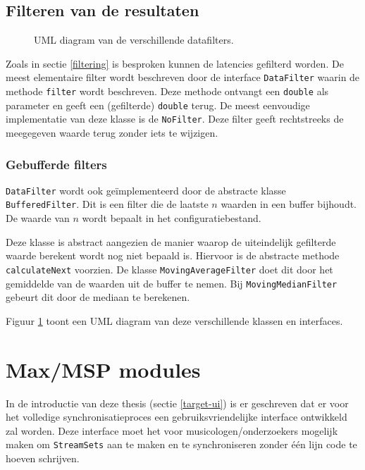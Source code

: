 \subsection{Filteren van de resultaten}
\label{filterontwerp}

\begin{figure}[h!]
	\captionsetup{width=0.7\textwidth}
	\caption{UML diagram van de verschillende datafilters.}
	\begin{center}
		\advance\parskip0.3cm
		
	\end{center}
	\label{filterUML}
\end{figure}

Zoals in sectie \ref{filtering} is besproken kunnen de latencies gefilterd worden. De meest elementaire filter wordt beschreven door de interface \texttt{DataFilter} waarin de methode \texttt{filter} wordt beschreven. Deze methode ontvangt een \texttt{double} als parameter en geeft een (gefilterde) \texttt{double} terug. De meest eenvoudige implementatie van deze klasse is de \texttt{NoFilter}. Deze filter geeft rechtstreeks de meegegeven waarde terug zonder iets te wijzigen.

\subsubsection{Gebufferde filters}

\texttt{DataFilter} wordt ook geïmplementeerd door de abstracte klasse \texttt{BufferedFilter}. Dit is een filter die de laatste $ n $ waarden in een buffer bijhoudt. De waarde van $ n $ wordt bepaalt in het configuratiebestand. 

Deze klasse is abstract aangezien de manier waarop de uiteindelijk gefilterde waarde \mbox{berekent} wordt nog niet bepaald is. Hiervoor is de abstracte methode \texttt{calculateNext} voorzien. De klasse \texttt{MovingAverageFilter} doet dit door het gemiddelde van de waarden uit de buffer te nemen. Bij \texttt{MovingMedianFilter} gebeurt dit door de mediaan te berekenen.

Figuur \ref{filterUML} toont een UML diagram van deze verschillende klassen en interfaces.

\section{Max/MSP modules}

In de introductie van deze thesis (sectie \ref{target-ui}) is er geschreven dat er voor het volledige synchronisatieproces een gebruiksvriendelijke interface ontwikkeld zal worden. Deze interface moet het voor musicologen/onderzoekers mogelijk maken om \texttt{StreamSets} aan te maken en te synchroniseren zonder één lijn code te hoeven schrijven.

